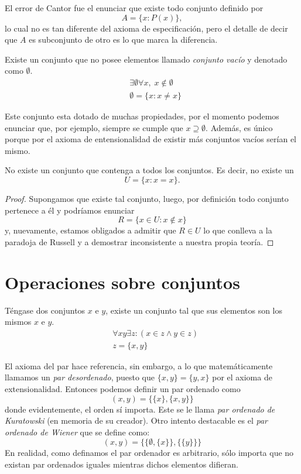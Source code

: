 \documentclass[11pt,oneside,a4paper]{book}
\begin{document}
El error de Cantor fue el enunciar que existe todo conjunto definido por
$$A=\{x:P(x)\},$$
lo cual no es tan diferente del axioma de especificación, pero el detalle de decir que $A$ es subconjunto de otro es lo que marca la diferencia.
\begin{axiom}
Existe un conjunto que no posee elementos llamado \textit{conjunto vacío} y denotado como $\emptyset$.
$$
\begin{aligned}
&\exists\emptyset\forall x,\; x\notin\emptyset\\
&\emptyset=\{x:x\neq x\}
\end{aligned}
$$
\end{axiom}
Este conjunto esta dotado de muchas propiedades, por el momento podemos enunciar que, por ejemplo, siempre se cumple que $x\supseteq\emptyset$. Además, es único porque por el axioma de entensionalidad de existir más conjuntos vacíos serían el mismo.
\begin{thm}
No existe un conjunto que contenga a todos los conjuntos. Es decir, no existe un
$$U=\{x:x=x\}.$$
\end{thm}
\begin{proof}
Supongamos que existe tal conjunto, luego, por definición todo conjunto pertenece a él y podríamos enunciar
$$R=\{x\in U:x\notin x\}$$
y, nuevamente, estamos obligados a admitir que $R\in U$ lo que conlleva a la paradoja de Russell y a demostrar inconsistente a nuestra propia teoría.
\end{proof}

\section{Operaciones sobre conjuntos}
\begin{axiom}
Téngase dos conjuntos $x$ e $y$, existe un conjunto tal que sus elementos son los mismos $x$ e $y$.
$$
\begin{aligned}
&\forall xy\exists z:(x\in z\wedge y\in z)\\
&z=\{x,y\}
\end{aligned}
$$
\end{axiom}
El axioma del par hace referencia, sin embargo, a lo que matemáticamente llamamos un \textit{par desordenado}, puesto que $\{x,y\}=\{y,x\}$ por el axioma de extensionalidad. Entonces podemos definir un par ordenado como
$$
(x,y)=\{\{x\},\{x,y\}\}
$$
donde evidentemente, el orden sí importa. Este se le llama \textit{par ordenado de Kuratowski} (en memoria de su creador). Otro intento destacable es el \textit{par ordenado de Wiener} que se define como:
$$(x,y)=\{\{\emptyset,\{x\}\},\{\{y\}\}\}$$
En realidad, como definamos el par ordenador es arbitrario, sólo importa que no existan par ordenados iguales mientras dichos elementos difieran.
\end{document}
